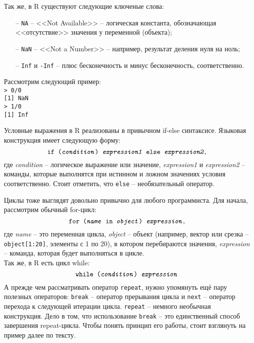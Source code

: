     Так же, в R существуют следующие ключеные слова:
    \begin{itemize}
        \item[--] \texttt{NA} -- <<Not Available>> -- логическая константа, обозначающая
            <<отсутствие>> значения у переменной (объекта);
        \item[--] \texttt{NaN} -- <<Not a Number>> -- например, результат деления нуля на 
            ноль;
        \item[--] \texttt{Inf} и \texttt{-Inf} -- плюс бесконечность и минус бесконечность,
            соответственно.
    \end{itemize}

    Рассмотрим следующий пример:\\
    \indent\texttt{> 0/0} \\
    \indent\texttt{[1] NaN} \\
    \indent\texttt{> 1/0} \\
    \indent\texttt{[1] Inf}

    Условные выражения в R реализованы в привычном if-else синтаксисе. Языковая конструкция
    имеет следующую форму:  
    $$ \texttt{if (\textit{condition}) \textit{expression1} else \textit{expression2}}, $$
    где \textit{condition} -- логическое выражение или значение, \textit{expression1} и 
    \textit{expression2} -- команды, которые выполнятся при истинном и ложном значениях 
    условия соответственно. Стоит отметить, что \texttt{else} -- необязательный оператор.

    Циклы тоже выглядят довольно привычно для любого программиста. Для начала, рассмотрим
    обычный for-цикл: 
    $$ \texttt{for (\textit{name} in \textit{object}) \textit{expression}}, $$
    где \textit{name} -- это переменная цикла, \textit{object} -- объект (например, вектор
    или срезка -- \texttt{object[1:20]}, элементы с 1 по 20), в котором перебираются 
    значения, \textit{expression} -- команда, которая будет выполняться в цикле. \\
    Так же, в R есть цикл while:
    $$ \texttt{while (\textit{condition}) \textit{expression}} $$
    \indent А прежде чем рассматривать оператор \texttt{repeat}, нужно упомянуть ещё пару 
    полезных операторов: \texttt{break} -- оператор прерывания цикла и \texttt{next} -- 
    оператор перехода к следующей итерации цикла. \texttt{repeat} -- немного необычная 
    конструкция. Дело в том, что использование \texttt{break} -- это единственный способ
    завершения repeat-цикла. Чтобы понять принцип его работы, стоит взглянуть на пример
    далее по тексту.

